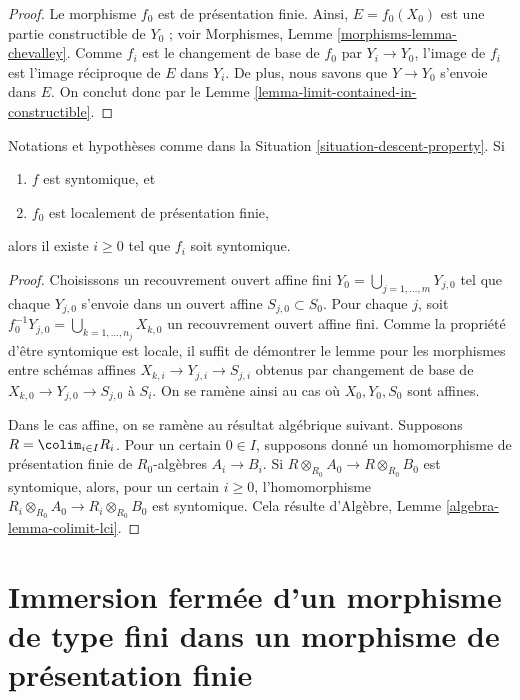 \begin{proof}
Le morphisme $f_0$ est de présentation finie. Ainsi,
$E = f_0(X_0)$ est une partie constructible de $Y_0$ ; voir Morphismes,
Lemme \ref{morphisms-lemma-chevalley}. Comme $f_i$ est le changement de base
de $f_0$ par $Y_i \to Y_0$, l'image de $f_i$ est l'image réciproque de $E$
dans $Y_i$. De plus, nous savons que $Y \to Y_0$ s'envoie dans $E$. On
conclut donc par le Lemme \ref{lemma-limit-contained-in-constructible}.
\end{proof}

\begin{lemma}
\label{lemma-descend-syntomic}
Notations et hypothèses comme dans la
Situation \ref{situation-descent-property}. Si
\begin{enumerate}
\item $f$ est syntomique, et
\item $f_0$ est localement de présentation finie,
\end{enumerate}
alors il existe $i \geq 0$ tel que $f_i$ soit syntomique.
\end{lemma}

\begin{proof}
Choisissons un recouvrement ouvert affine fini
$Y_0 = \bigcup_{j = 1, \ldots, m} Y_{j, 0}$ tel que chaque $Y_{j, 0}$
s'envoie dans un ouvert affine $S_{j, 0} \subset S_0$. Pour chaque $j$, soit
$f_0^{-1}Y_{j, 0} = \bigcup_{k = 1, \ldots, n_j} X_{k, 0}$ un recouvrement
ouvert affine fini. Comme la propriété d'être syntomique est locale, il
suffit de démontrer le lemme pour les morphismes entre schémas affines
$X_{k, i} \to Y_{j, i} \to S_{j, i}$ obtenus par changement de base
de $X_{k, 0} \to Y_{j, 0} \to S_{j, 0}$ à $S_i$. On se ramène ainsi au cas où
$X_0, Y_0, S_0$ sont affines.

\medskip\noindent
Dans le cas affine, on se ramène au résultat algébrique suivant. Supposons
$R = \colim_{i \in I} R_i$. Pour un certain $0 \in I$, supposons donné un
homomorphisme de présentation finie de $R_0$-algèbres $A_i \to B_i$. Si
$R \otimes_{R_0} A_0 \to R \otimes_{R_0} B_0$ est syntomique, alors, pour
un certain $i \geq 0$, l'homomorphisme
$R_i \otimes_{R_0} A_0 \to R_i \otimes_{R_0} B_0$ est syntomique. Cela
résulte d'Algèbre, Lemme \ref{algebra-lemma-colimit-lci}.
\end{proof}





\section{Immersion fermée d'un morphisme de type fini dans un morphisme de présentation finie}
\label{section-finite-type-closed-in-finite-presentation}

